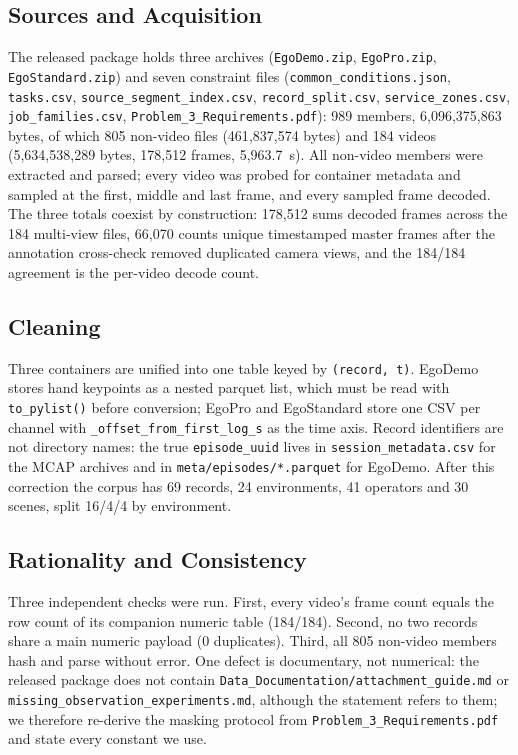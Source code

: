 \documentclass{swmcmthesis}
\begin{document}
\subsection{Sources and Acquisition}
\begin{sloppypar}
The released package holds three archives (\texttt{EgoDemo.zip}, \texttt{EgoPro.zip}, \texttt{EgoStandard.zip}) and seven constraint files (\texttt{common\_conditions.json}, \texttt{tasks.csv}, \texttt{source\_segment\_index.csv}, \texttt{record\_split.csv}, \texttt{service\_zones.csv}, \texttt{job\_families.csv}, \texttt{Problem\_3\_Requirements.pdf}): 989 members, 6{,}096{,}375{,}863 bytes, of which 805 non-video files (461{,}837{,}574 bytes) and 184 videos (5{,}634{,}538{,}289 bytes, 178{,}512 frames, 5{,}963.7~s). All non-video members were extracted and parsed; every video was probed for container metadata and sampled at the first, middle and last frame, and every sampled frame decoded. The three totals coexist by construction: 178{,}512 sums decoded frames across the 184 multi-view files, 66{,}070 counts unique timestamped master frames after the annotation cross-check removed duplicated camera views, and the 184/184 agreement is the per-video decode count.
\end{sloppypar}

\subsection{Cleaning}
Three containers are unified into one table keyed by \texttt{(record, t)}. EgoDemo stores hand keypoints as a nested parquet list, which must be read with \texttt{to\_pylist()} before conversion; EgoPro and EgoStandard store one CSV per channel with \texttt{\_offset\_from\_first\_log\_s} as the time axis. Record identifiers are not directory names: the true \texttt{episode\_uuid} lives in \texttt{session\_metadata.csv} for the MCAP archives and in \texttt{meta/episodes/*.parquet} for EgoDemo. After this correction the corpus has 69 records, 24 environments, 41 operators and 30 scenes, split 16/4/4 by environment.

\subsection{Rationality and Consistency}
Three independent checks were run. First, every video's frame count equals the row count of its companion numeric table (184/184). Second, no two records share a main numeric payload (0 duplicates). Third, all 805 non-video members hash and parse without error. One defect is documentary, not numerical: the released package does not contain \texttt{Data\_Documentation/attachment\_guide.md} or \texttt{missing\_observation\_experiments.md}, although the statement refers to them; we therefore re-derive the masking protocol from \texttt{Problem\_3\_Requirements.pdf} and state every constant we use.
\end{document}
